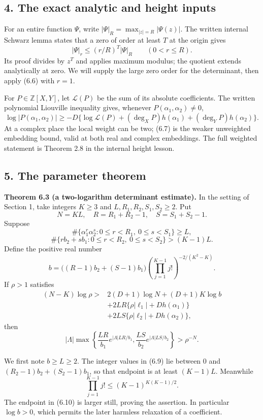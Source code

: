\documentclass[
  11pt,
  a4paper,
]{article}
\begin{document}
\subsection{4. The exact analytic and height
inputs}\label{the-exact-analytic-and-height-inputs}

For an entire function \(\Psi\), write
\(|\Psi|_R=\max_{|z|=R}|\Psi(z)|\). The written internal Schwarz lemma
states that a zero of order at least \(T\) at the origin gives \[
|\Psi|_r\le(r/R)^T|\Psi|_R\qquad(0<r\le R). \tag{6.6}
\] Its proof divides by \(z^T\) and applies maximum modulus; the
quotient extends analytically at zero. We will supply the large zero
order for the determinant, then apply (6.6) with \(r=1\).

For \(P\in\mathbb Z[X,Y]\), let \(\mathcal L(P)\) be the sum of its
absolute coefficients. The written polynomial Liouville inequality
gives, whenever \(P(\alpha_1,\alpha_2)\ne0\), \[
\log|P(\alpha_1,\alpha_2)|
\ge-D\{\log\mathcal L(P)+(\deg_XP)h(\alpha_1)
+(\deg_YP)h(\alpha_2)\}. \tag{6.7}
\] At a complex place the local weight can be two; (6.7) is the weaker
unweighted embedding bound, valid at both real and complex embeddings.
The full weighted statement is Theorem 2.8 in the internal height
lesson.

\subsection{5. The parameter theorem}\label{the-parameter-theorem}

\textbf{Theorem 6.3 (a two-logarithm determinant estimate).} In the
setting of Section 1, take integers \(K\ge3\) and
\(L,R_1,R_2,S_1,S_2\ge2\). Put \[
N=KL,\quad R=R_1+R_2-1,\quad S=S_1+S_2-1.
\] Suppose \[
\#\{\alpha_1^r\alpha_2^s:0\le r<R_1,\ 0\le s<S_1\}\ge L, \tag{6.8}
\] \[
\#\{rb_2+sb_1:0\le r<R_2,\ 0\le s<S_2\}>(K-1)L. \tag{6.9}
\] Define the positive real number \[
b=\bigl((R-1)b_2+(S-1)b_1\bigr)
\left(\prod_{j=1}^{K-1}j!\right)^{-2/(K^2-K)}. \tag{6.10}
\] If \(\rho>1\) satisfies \[
\begin{aligned}
(N-K)\log\rho>{}&2(D+1)\log N+(D+1)K\log b\\
&+2LR\{\rho|\ell_1|+Dh(\alpha_1)\}\\
&+2LS\{\rho|\ell_2|+Dh(\alpha_2)\},
\end{aligned} \tag{6.11}
\] then \[
|\Lambda|\max\left\{
\frac{LR}{b_1}e^{|\Lambda|LR/b_1},
\frac{LS}{b_2}e^{|\Lambda|LS/b_2}
\right\}>\rho^{-N}. \tag{6.12}
\]

We first note \(b\ge L\ge2\). The integer values in (6.9) lie between
\(0\) and \((R_2-1)b_2+(S_2-1)b_1\), so that endpoint is at least
\((K-1)L\). Meanwhile \[
\prod_{j=1}^{K-1}j!\le(K-1)^{K(K-1)/2}.
\] The endpoint in (6.10) is larger still, proving the assertion. In
particular \(\log b>0\), which permits the later harmless relaxation of
a coefficient.
\end{document}
